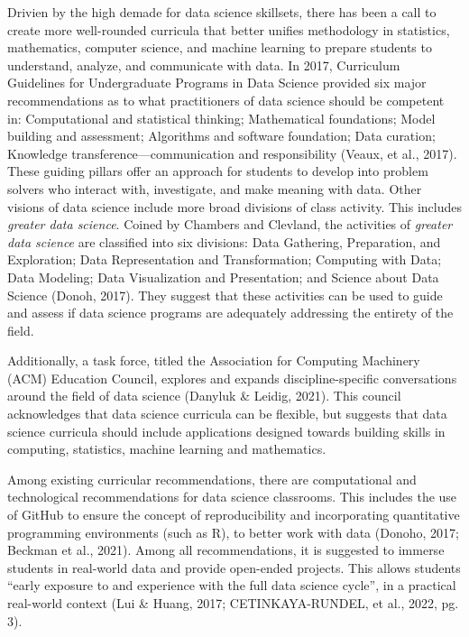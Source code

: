 \documentclass[
  12pt]{article}
\begin{document}
Drivien by the high demade for data science skillsets, there has been a
call to create more well-rounded curricula that better unifies
methodology in statistics, mathematics, computer science, and machine
learning to prepare students to understand, analyze, and communicate
with data. In 2017, Curriculum Guidelines for Undergraduate Programs in
Data Science provided six major recommendations as to what practitioners
of data science should be competent in: Computational and statistical
thinking; Mathematical foundations; Model building and assessment;
Algorithms and software foundation; Data curation; Knowledge
transference---communication and responsibility (Veaux, et al., 2017).
These guiding pillars offer an approach for students to develop into
problem solvers who interact with, investigate, and make meaning with
data. Other visions of data science include more broad divisions of
class activity. This includes \emph{greater data science}. Coined by
Chambers and Clevland, the activities of \emph{greater data science} are
classified into six divisions: Data Gathering, Preparation, and
Exploration; Data Representation and Transformation; Computing with
Data; Data Modeling; Data Visualization and Presentation; and Science
about Data Science (Donoh, 2017). They suggest that these activities can
be used to guide and assess if data science programs are adequately
addressing the entirety of the field.

Additionally, a task force, titled the Association for Computing
Machinery (ACM) Education Council, explores and expands
discipline-specific conversations around the field of data science
(Danyluk \& Leidig, 2021). This council acknowledges that data science
curricula can be flexible, but suggests that data science curricula
should include applications designed towards building skills in
computing, statistics, machine learning and mathematics.

Among existing curricular recommendations, there are computational and
technological recommendations for data science classrooms. This includes
the use of GitHub to ensure the concept of reproducibility and
incorporating quantitative programming environments (such as R), to
better work with data (Donoho, 2017; Beckman et al., 2021). Among all
recommendations, it is suggested to immerse students in real-world data
and provide open-ended projects. This allows students ``early exposure
to and experience with the full data science cycle'', in a practical
real-world context (Lui \& Huang, 2017; CETINKAYA-RUNDEL, et al., 2022,
pg. 3).
\end{document}
